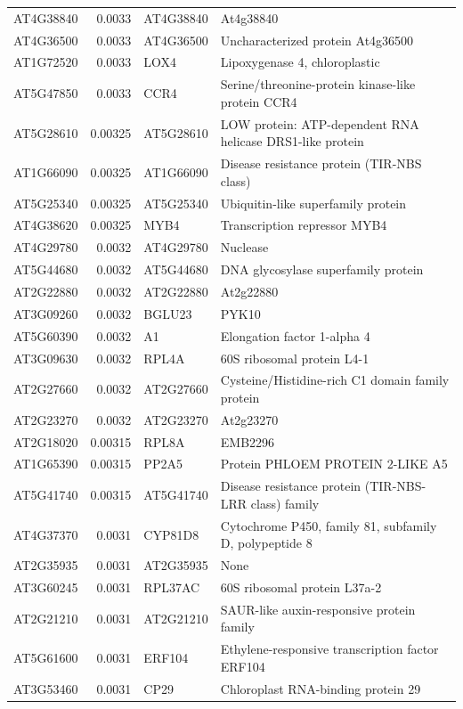 \documentclass[11pt]{article}
\begin{document}
\begin{center}
\begin{tabular}{lrll}
AT4G38840 & 0.0033 & AT4G38840 & At4g38840\\
AT4G36500 & 0.0033 & AT4G36500 & Uncharacterized protein At4g36500\\
AT1G72520 & 0.0033 & LOX4 & Lipoxygenase 4, chloroplastic\\
AT5G47850 & 0.0033 & CCR4 & Serine/threonine-protein kinase-like protein CCR4\\
AT5G28610 & 0.00325 & AT5G28610 & LOW protein: ATP-dependent RNA helicase DRS1-like protein\\
AT1G66090 & 0.00325 & AT1G66090 & Disease resistance protein (TIR-NBS class)\\
AT5G25340 & 0.00325 & AT5G25340 & Ubiquitin-like superfamily protein\\
AT4G38620 & 0.00325 & MYB4 & Transcription repressor MYB4\\
AT4G29780 & 0.0032 & AT4G29780 & Nuclease\\
AT5G44680 & 0.0032 & AT5G44680 & DNA glycosylase superfamily protein\\
AT2G22880 & 0.0032 & AT2G22880 & At2g22880\\
AT3G09260 & 0.0032 & BGLU23 & PYK10\\
AT5G60390 & 0.0032 & A1 & Elongation factor 1-alpha 4\\
AT3G09630 & 0.0032 & RPL4A & 60S ribosomal protein L4-1\\
AT2G27660 & 0.0032 & AT2G27660 & Cysteine/Histidine-rich C1 domain family protein\\
AT2G23270 & 0.0032 & AT2G23270 & At2g23270\\
AT2G18020 & 0.00315 & RPL8A & EMB2296\\
AT1G65390 & 0.00315 & PP2A5 & Protein PHLOEM PROTEIN 2-LIKE A5\\
AT5G41740 & 0.00315 & AT5G41740 & Disease resistance protein (TIR-NBS-LRR class) family\\
AT4G37370 & 0.0031 & CYP81D8 & Cytochrome P450, family 81, subfamily D, polypeptide 8\\
AT2G35935 & 0.0031 & AT2G35935 & None\\
AT3G60245 & 0.0031 & RPL37AC & 60S ribosomal protein L37a-2\\
AT2G21210 & 0.0031 & AT2G21210 & SAUR-like auxin-responsive protein family\\
AT5G61600 & 0.0031 & ERF104 & Ethylene-responsive transcription factor ERF104\\
AT3G53460 & 0.0031 & CP29 & Chloroplast RNA-binding protein 29\\

\end{tabular}
\end{center}
\end{document}
